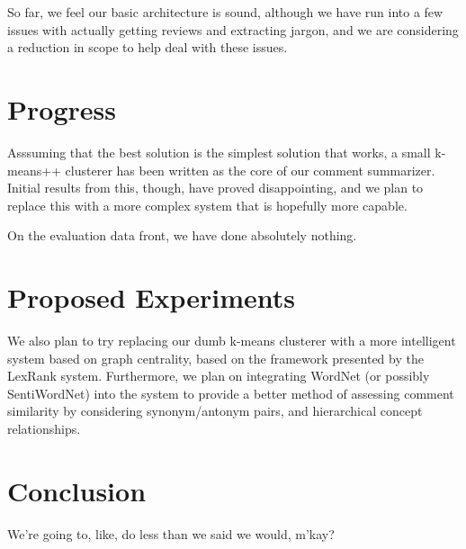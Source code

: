\documentclass{article}
\begin{document}
So far, we feel our basic architecture is sound, although we have run into a
few issues with actually getting reviews and extracting jargon, and we are
considering a reduction in scope to help deal with these issues.

\section{Progress}
Asssuming that the best solution is the simplest solution that works, a
small k-means++ clusterer has been written as the core of our comment
summarizer. Initial results from this, though, have proved disappointing, and
we plan to replace this with a more complex system that is hopefully more
capable.

On the evaluation data front, we have done absolutely nothing.

\section{Proposed Experiments}

We also plan to try replacing our dumb k-means clusterer with a more intelligent
system based on graph centrality, based on the framework presented by the
LexRank system. Furthermore, we plan on integrating WordNet (or possibly
SentiWordNet) into the system to provide a better method of assessing comment
similarity by considering synonym/antonym pairs, and hierarchical concept
relationships.

\section{Conclusion}
We're going to, like, do less than we said we would, m'kay?
\end{document}
